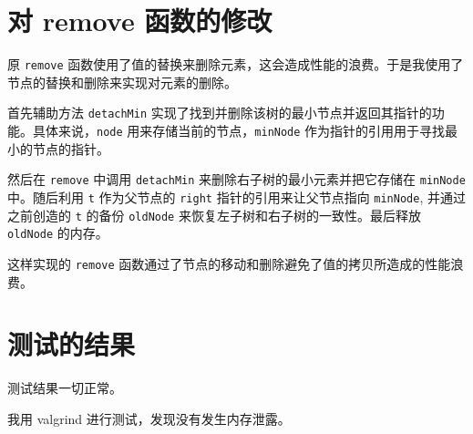 \documentclass[UTF8]{ctexart}
\begin{document}
\pagestyle{fancy}
\fancyhead{}

\section{对 remove 函数的修改}

原 \verb|remove| 函数使用了值的替换来删除元素，这会造成性能的浪费。于是我使用了节点的替换和删除来实现对元素的删除。

首先辅助方法 \verb|detachMin| 实现了找到并删除该树的最小节点并返回其指针的功能。具体来说，\verb|node| 用来存储当前的节点，\verb|minNode| 作为指针的引用用于寻找最小的节点的指针。

然后在 \verb|remove| 中调用 \verb|detachMin| 来删除右子树的最小元素并把它存储在 \verb|minNode| 中。随后利用 \verb|t| 作为父节点的 \verb|right| 指针的引用来让父节点指向 \verb|minNode|, 并通过之前创造的 \verb|t| 的备份 \verb|oldNode| 来恢复左子树和右子树的一致性。最后释放 \verb|oldNode| 的内存。

这样实现的 \verb|remove| 函数通过了节点的移动和删除避免了值的拷贝所造成的性能浪费。

\section{测试的结果}

测试结果一切正常。

我用 valgrind 进行测试，发现没有发生内存泄露。
\end{document}

